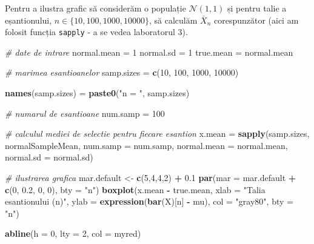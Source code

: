 \documentclass[
]{article}
\newenvironment{Shaded}{\begin{snugshade}}{\end{snugshade}}
\newcommand{\CommentTok}[1]{\textcolor[rgb]{0.56,0.35,0.01}{\textit{#1}}}
\newcommand{\DataTypeTok}[1]{\textcolor[rgb]{0.13,0.29,0.53}{#1}}
\newcommand{\DecValTok}[1]{\textcolor[rgb]{0.00,0.00,0.81}{#1}}
\newcommand{\FloatTok}[1]{\textcolor[rgb]{0.00,0.00,0.81}{#1}}
\newcommand{\KeywordTok}[1]{\textcolor[rgb]{0.13,0.29,0.53}{\textbf{#1}}}
\newcommand{\NormalTok}[1]{#1}
\newcommand{\OperatorTok}[1]{\textcolor[rgb]{0.81,0.36,0.00}{\textbf{#1}}}
\newcommand{\StringTok}[1]{\textcolor[rgb]{0.31,0.60,0.02}{#1}}
\begin{document}
Pentru a ilustra grafic să considerăm o populație \(\mathcal{N}(1,1)\)
și pentru talie a eșantionului, \(n\in\{10, 100, 1000, 10000\}\), să
calculăm \(\bar{X}_n\) corespunzător (aici am folosit funcția
\texttt{sapply} - a se vedea laboratorul 3).

\begin{Shaded}
\begin{Highlighting}[]
\CommentTok{# date de intrare}
\NormalTok{normal.mean =}\StringTok{ }\DecValTok{1}
\NormalTok{normal.sd =}\StringTok{ }\DecValTok{1}
\NormalTok{true.mean =}\StringTok{ }\NormalTok{normal.mean}

\CommentTok{# marimea esantioanelor}
\NormalTok{samp.sizes =}\StringTok{ }\KeywordTok{c}\NormalTok{(}\DecValTok{10}\NormalTok{, }\DecValTok{100}\NormalTok{, }\DecValTok{1000}\NormalTok{, }\DecValTok{10000}\NormalTok{)}

\KeywordTok{names}\NormalTok{(samp.sizes) =}\StringTok{ }\KeywordTok{paste0}\NormalTok{(}\StringTok{"n = "}\NormalTok{, samp.sizes)}

\CommentTok{# numarul de esantioane}
\NormalTok{num.samp =}\StringTok{ }\DecValTok{100}

\CommentTok{# calculul mediei de selectie pentru fiecare esantion}
\NormalTok{x.mean =}\StringTok{ }\KeywordTok{sapply}\NormalTok{(samp.sizes, normalSampleMean, }\DataTypeTok{num.samp =}\NormalTok{ num.samp, }
                \DataTypeTok{normal.mean =}\NormalTok{ normal.mean, }\DataTypeTok{normal.sd =}\NormalTok{ normal.sd)}

\CommentTok{# ilustrarea grafica}
\NormalTok{mar.default <-}\StringTok{ }\KeywordTok{c}\NormalTok{(}\DecValTok{5}\NormalTok{,}\DecValTok{4}\NormalTok{,}\DecValTok{4}\NormalTok{,}\DecValTok{2}\NormalTok{) }\OperatorTok{+}\StringTok{ }\FloatTok{0.1}
\KeywordTok{par}\NormalTok{(}\DataTypeTok{mar =}\NormalTok{ mar.default }\OperatorTok{+}\StringTok{ }\KeywordTok{c}\NormalTok{(}\DecValTok{0}\NormalTok{, }\FloatTok{0.2}\NormalTok{, }\DecValTok{0}\NormalTok{, }\DecValTok{0}\NormalTok{), }\DataTypeTok{bty =} \StringTok{"n"}\NormalTok{) }
\KeywordTok{boxplot}\NormalTok{(x.mean }\OperatorTok{-}\StringTok{ }\NormalTok{true.mean, }
        \DataTypeTok{xlab =} \StringTok{"Talia esantionului (n)"}\NormalTok{, }
        \DataTypeTok{ylab =} \KeywordTok{expression}\NormalTok{(}\KeywordTok{bar}\NormalTok{(X)[n] }\OperatorTok{-}\StringTok{ }\NormalTok{mu),}
        \DataTypeTok{col =} \StringTok{"gray80"}\NormalTok{,}
        \DataTypeTok{bty =} \StringTok{"n"}\NormalTok{)}

\KeywordTok{abline}\NormalTok{(}\DataTypeTok{h =} \DecValTok{0}\NormalTok{, }\DataTypeTok{lty =} \DecValTok{2}\NormalTok{, }\DataTypeTok{col =}\NormalTok{ myred)}
\end{Highlighting}
\end{Shaded}
\end{document}
